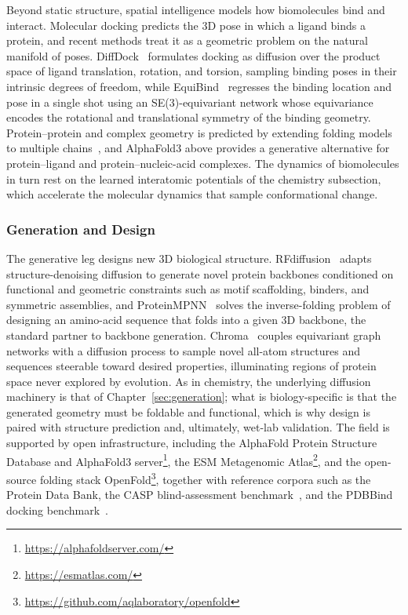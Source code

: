 Beyond static structure, spatial intelligence models how biomolecules bind and interact.
Molecular docking predicts the 3D pose in which a ligand binds a protein, and recent methods treat it as a geometric problem on the natural manifold of poses.
DiffDock~\cite{corso2023diffdock} formulates docking as diffusion over the product space of ligand translation, rotation, and torsion, sampling binding poses in their intrinsic degrees of freedom, while EquiBind~\cite{stark2022equibind} regresses the binding location and pose in a single shot using an SE(3)-equivariant network whose equivariance encodes the rotational and translational symmetry of the binding geometry.
Protein--protein and complex geometry is predicted by extending folding models to multiple chains~\cite{evans2022protein}, and AlphaFold3 above provides a generative alternative for protein--ligand and protein--nucleic-acid complexes.
The dynamics of biomolecules in turn rest on the learned interatomic potentials of the chemistry subsection, which accelerate the molecular dynamics that sample conformational change.

\subsubsection{Generation and Design}

The generative leg designs new 3D biological structure.
RFdiffusion~\cite{watson2023novo} adapts structure-denoising diffusion to generate novel protein backbones conditioned on functional and geometric constraints such as motif scaffolding, binders, and symmetric assemblies, and ProteinMPNN~\cite{dauparas2022robust} solves the inverse-folding problem of designing an amino-acid sequence that folds into a given 3D backbone, the standard partner to backbone generation.
Chroma~\cite{ingraham2023illuminating} couples equivariant graph networks with a diffusion process to sample novel all-atom structures and sequences steerable toward desired properties, illuminating regions of protein space never explored by evolution.
As in chemistry, the underlying diffusion machinery is that of Chapter~\ref{sec:generation}; what is biology-specific is that the generated geometry must be foldable and functional, which is why design is paired with structure prediction and, ultimately, wet-lab validation.
The field is supported by open infrastructure, including the AlphaFold Protein Structure Database and AlphaFold3 server\footnote{\url{https://alphafoldserver.com/}}, the ESM Metagenomic Atlas\footnote{\url{https://esmatlas.com/}}, and the open-source folding stack OpenFold\footnote{\url{https://github.com/aqlaboratory/openfold}}, together with reference corpora such as the Protein Data Bank, the CASP blind-assessment benchmark~\cite{kryshtafovych2021critical}, and the PDBBind docking benchmark~\cite{wang2004pdbbind}.

